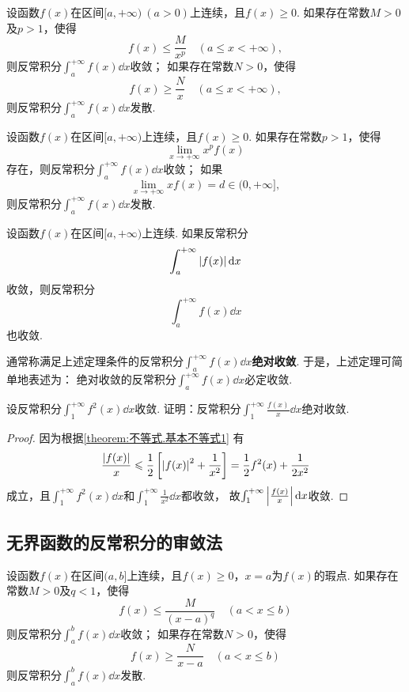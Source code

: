 \begin{theorem}[比较审敛法]\label{theorem:定积分.无穷限反常积分的比较审敛法}
设函数\(f(x)\)在区间\([a,+\infty)\ (a>0)\)上连续，且\(f(x) \geqslant 0\).
如果存在常数\(M>0\)及\(p>1\)，使得\[
f(x) \leqslant \frac{M}{x^p} \quad (a \leqslant x < +\infty),
\]则反常积分\(\int_a^{+\infty} f(x) \dd{x}\)收敛；
如果存在常数\(N>0\)，使得\[
f(x) \geqslant \frac{N}{x} \quad (a \leqslant x < +\infty),
\]则反常积分\(\int_a^{+\infty} f(x) \dd{x}\)发散.
\end{theorem}

\begin{theorem}[极限审敛法]\label{theorem:定积分.无穷限反常积分的极限审敛法}
设函数\(f(x)\)在区间\([a,+\infty)\)上连续，且\(f(x) \geqslant 0\).
如果存在常数\(p > 1\)，使得\[
\lim\limits_{x \to +\infty} x^p f(x)
\]存在，则反常积分\(\int_a^{+\infty} f(x) \dd{x}\)收敛；
如果\[
\lim\limits_{x \to +\infty} x f(x) = d \in (0,+\infty],
\]则反常积分\(\int_a^{+\infty} f(x) \dd{x}\)发散.
\end{theorem}

\begin{theorem}\label{theorem:定积分.绝对收敛的无穷限反常积分必收敛}
设函数\(f(x)\)在区间\([a,+\infty)\)上连续.
如果反常积分\[
\int_a^{+\infty} \abs{f(x)} \dd{x}
\]收敛，则反常积分\[
\int_a^{+\infty} f(x) \dd{x}
\]也收敛.
\end{theorem}
通常称满足上述定理条件的反常积分\(\int_a^{+\infty} f(x) \dd{x}\)\textbf{绝对收敛}.
于是，上述定理可简单地表述为：
绝对收敛的反常积分\(\int_a^{+\infty} f(x) \dd{x}\)必定收敛.

\begin{example}
设反常积分\(\int_1^{+\infty} f^2(x) \dd{x}\)收敛.
证明：反常积分\(\int_1^{+\infty} \frac{f(x)}{x} \dd{x}\)绝对收敛.
\begin{proof}
因为根据\cref{theorem:不等式.基本不等式1} 有\[
\frac{\abs{f(x)}}{x} \leqslant \frac{1}{2} \left[
	\abs{f(x)}^2 + \frac{1}{x^2}
\right]
= \frac{1}{2} f^2(x) + \frac{1}{2x^2}
\]成立，且\(\int_1^{+\infty} f^2(x) \dd{x}\)和\(\int_1^{+\infty} \frac{1}{x^2} \dd{x}\)都收敛，%
故\(\int_1^{+\infty} \abs{\frac{f(x)}{x}} \dd{x}\)收敛.
\end{proof}
\end{example}

\subsection{无界函数的反常积分的审敛法}
\begin{theorem}[比较审敛法]\label{theorem:定积分.无界函数的反常积分的比较审敛法}
设函数\(f(x)\)在区间\((a,b]\)上连续，且\(f(x) \geqslant 0\)，\(x=a\)为\(f(x)\)的瑕点.
如果存在常数\(M > 0\)及\(q < 1\)，使得\[
f(x) \leqslant \frac{M}{(x-a)^q} \quad (a < x \leqslant b)
\]则反常积分\(\int_a^b f(x) \dd{x}\)收敛；
如果存在常数\(N > 0\)，使得\[
f(x) \geqslant \frac{N}{x - a} \quad (a < x \leqslant b)
\]则反常积分\(\int_a^b f(x) \dd{x}\)发散.
\end{theorem}

